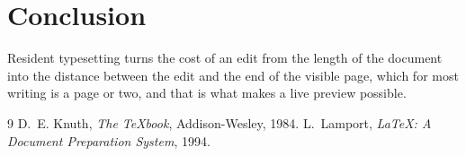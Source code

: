 \documentclass[11pt]{article}
\begin{document}
\lipsum[21-30]

\section{Conclusion}
Resident typesetting turns the cost of an edit from the length of the document
into the distance between the edit and the end of the visible page, which for
most writing is a page or two, and that is what makes a live preview possible.

\begin{thebibliography}{9}
 D.~E. Knuth, \emph{The \TeX book}, Addison-Wesley, 1984.
 L.~Lamport, \emph{\LaTeX: A Document Preparation System}, 1994.
\end{thebibliography}
\end{document}
